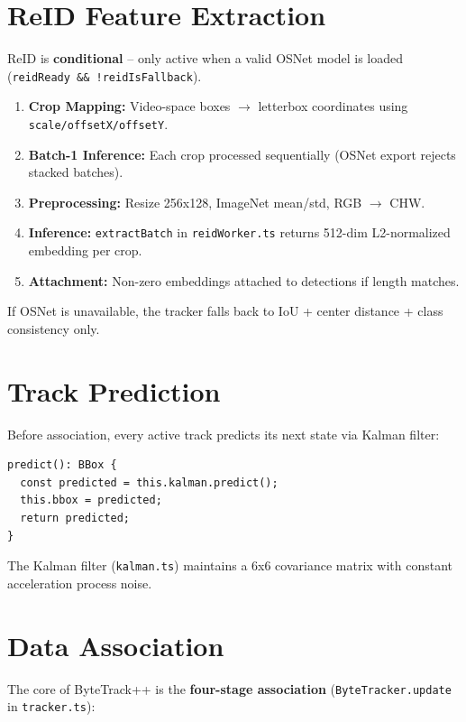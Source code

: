 \section{ReID Feature Extraction}
\label{sec:reid}

ReID is \textbf{conditional} -- only active when a valid OSNet model is loaded (\texttt{reidReady \&\& !reidIsFallback}).

\begin{enumerate}
    \item \textbf{Crop Mapping:} Video-space boxes $\to$ letterbox coordinates using \texttt{scale/offsetX/offsetY}.
    \item \textbf{Batch-1 Inference:} Each crop processed sequentially (OSNet export rejects stacked batches).
    \item \textbf{Preprocessing:} Resize 256x128, ImageNet mean/std, RGB $\to$ CHW.
    \item \textbf{Inference:} \texttt{extractBatch} in \texttt{reidWorker.ts} returns 512-dim L2-normalized embedding per crop.
    \item \textbf{Attachment:} Non-zero embeddings attached to detections if length matches.
\end{enumerate}

If OSNet is unavailable, the tracker falls back to IoU + center distance + class consistency only.

\section{Track Prediction}
\label{sec:track-pred}

Before association, every active track predicts its next state via Kalman filter:

\begin{lstlisting}[style=typescript, caption={Track prediction in tracker.ts}]
predict(): BBox {
  const predicted = this.kalman.predict();
  this.bbox = predicted;
  return predicted;
}
\end{lstlisting}

The Kalman filter (\texttt{kalman.ts}) maintains a 6x6 covariance matrix with constant acceleration process noise.

\section{Data Association}
\label{sec:association}

The core of ByteTrack++ is the \textbf{four-stage association} (\texttt{ByteTracker.update} in \texttt{tracker.ts}):


